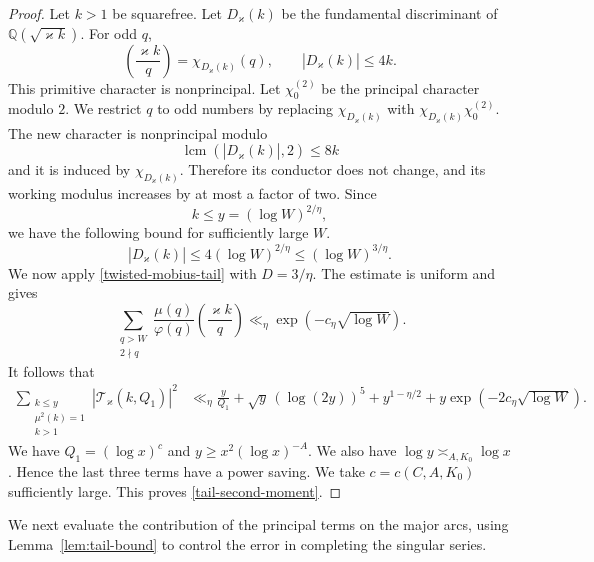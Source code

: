 \documentclass[12pt,reqno]{amsart}
\numberwithin{equation}{section}
\theoremstyle{plain}
\theoremstyle{remark}
\begin{document}
\begin{proof}
Let $k>1$ be squarefree.  Let $D_\varkappa(k)$ be the fundamental
discriminant of $\mathbb Q(\sqrt{\varkappa k})$.
For odd $q$,
\begin{equation*}
 \left(\frac{\varkappa k}{q}\right)
 =\chi_{D_\varkappa(k)}(q),
 \qquad
 |D_\varkappa(k)|\leq4k.
\end{equation*}
This primitive character is nonprincipal.  Let $\chi_0^{(2)}$ be the
principal character modulo $2$.  We restrict $q$ to odd numbers by
replacing $\chi_{D_\varkappa(k)}$ with
$\chi_{D_\varkappa(k)}\chi_0^{(2)}$.  The new character is
nonprincipal modulo
\begin{equation*}
 \operatorname{lcm}(|D_\varkappa(k)|,2)\leq8k
\end{equation*}
and it is induced by $\chi_{D_\varkappa(k)}$.  Therefore its conductor does
not change, and its working modulus increases by at most a factor of
two.
Since
\begin{equation*}
 k\leq y=(\log W)^{2/\eta},
\end{equation*}
we have the following bound for sufficiently large $W$.
\[
 |D_\varkappa(k)|\leq4(\log W)^{2/\eta}
 \leq(\log W)^{3/\eta}.
\]
We now apply \eqref{twisted-mobius-tail} with $D=3/\eta$.  The estimate
is uniform and gives
\begin{equation*}\label{tail-long-range}
 \sum_{\substack{q>W\\2\nmid q}}
 \frac{\mu(q)}{\varphi(q)}
 \left(\frac{\varkappa k}{q}\right)
 \ll_\eta \exp\left(-c_\eta\sqrt{\log W}\right).
\end{equation*}
It follows that
\begin{align*}
 \sum_{\substack{k\leq y\\\mu^2(k)=1\\k>1}}
 |\mathcal T_\varkappa(k,Q_1)|^2
 &\ll_\eta
 \frac y{Q_1}
 +\sqrt y\,(\log(2y))^5
 +y^{1-\eta/2}
 +y\exp\left(-2c_\eta\sqrt{\log W}\right).
\end{align*}
We have $Q_1=(\log x)^c$ and $y\geq x^2(\log x)^{-A}$.  We also have
$\log y\asymp_{A,K_0}\log x$.  Hence the last three terms have a power
saving.  We take $c=c(C,A,K_0)$ sufficiently large.  This proves
\eqref{tail-second-moment}.
\end{proof}

We next evaluate the contribution of the principal terms on the
major arcs, using Lemma~\ref{lem:tail-bound} to control the error
in completing the singular series.
\end{document}
